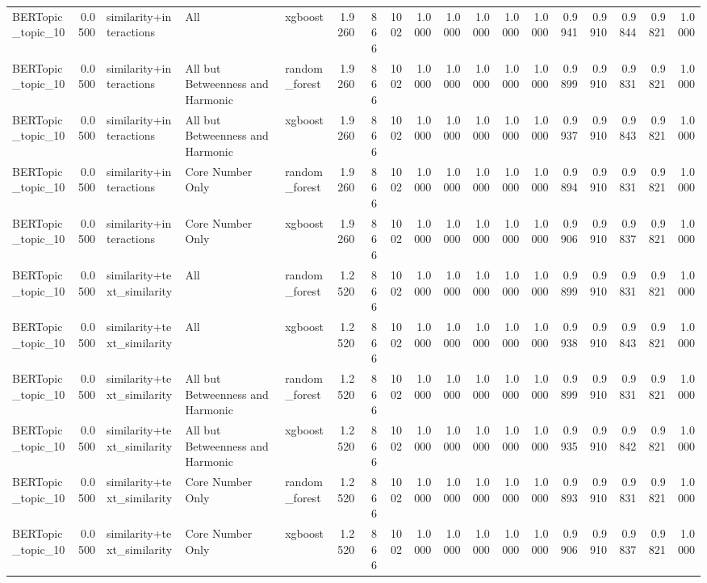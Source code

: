 \begin{tabular}{lrlllrrrrrrrrrrrrr}
BERTopic_topic_10 & 0.0500 & similarity+interactions & All & xgboost & 1.9260 & 866 & 1002 & 1.0000 & 1.0000 & 1.0000 & 1.0000 & 1.0000 & 0.9941 & 0.9910 & 0.9844 & 0.9821 & 1.0000 \\
BERTopic_topic_10 & 0.0500 & similarity+interactions & All but Betweenness and Harmonic & random_forest & 1.9260 & 866 & 1002 & 1.0000 & 1.0000 & 1.0000 & 1.0000 & 1.0000 & 0.9899 & 0.9910 & 0.9831 & 0.9821 & 1.0000 \\
BERTopic_topic_10 & 0.0500 & similarity+interactions & All but Betweenness and Harmonic & xgboost & 1.9260 & 866 & 1002 & 1.0000 & 1.0000 & 1.0000 & 1.0000 & 1.0000 & 0.9937 & 0.9910 & 0.9843 & 0.9821 & 1.0000 \\
BERTopic_topic_10 & 0.0500 & similarity+interactions & Core Number Only & random_forest & 1.9260 & 866 & 1002 & 1.0000 & 1.0000 & 1.0000 & 1.0000 & 1.0000 & 0.9894 & 0.9910 & 0.9831 & 0.9821 & 1.0000 \\
BERTopic_topic_10 & 0.0500 & similarity+interactions & Core Number Only & xgboost & 1.9260 & 866 & 1002 & 1.0000 & 1.0000 & 1.0000 & 1.0000 & 1.0000 & 0.9906 & 0.9910 & 0.9837 & 0.9821 & 1.0000 \\
BERTopic_topic_10 & 0.0500 & similarity+text_similarity & All & random_forest & 1.2520 & 866 & 1002 & 1.0000 & 1.0000 & 1.0000 & 1.0000 & 1.0000 & 0.9899 & 0.9910 & 0.9831 & 0.9821 & 1.0000 \\
BERTopic_topic_10 & 0.0500 & similarity+text_similarity & All & xgboost & 1.2520 & 866 & 1002 & 1.0000 & 1.0000 & 1.0000 & 1.0000 & 1.0000 & 0.9938 & 0.9910 & 0.9843 & 0.9821 & 1.0000 \\
BERTopic_topic_10 & 0.0500 & similarity+text_similarity & All but Betweenness and Harmonic & random_forest & 1.2520 & 866 & 1002 & 1.0000 & 1.0000 & 1.0000 & 1.0000 & 1.0000 & 0.9899 & 0.9910 & 0.9831 & 0.9821 & 1.0000 \\
BERTopic_topic_10 & 0.0500 & similarity+text_similarity & All but Betweenness and Harmonic & xgboost & 1.2520 & 866 & 1002 & 1.0000 & 1.0000 & 1.0000 & 1.0000 & 1.0000 & 0.9935 & 0.9910 & 0.9842 & 0.9821 & 1.0000 \\
BERTopic_topic_10 & 0.0500 & similarity+text_similarity & Core Number Only & random_forest & 1.2520 & 866 & 1002 & 1.0000 & 1.0000 & 1.0000 & 1.0000 & 1.0000 & 0.9893 & 0.9910 & 0.9831 & 0.9821 & 1.0000 \\
BERTopic_topic_10 & 0.0500 & similarity+text_similarity & Core Number Only & xgboost & 1.2520 & 866 & 1002 & 1.0000 & 1.0000 & 1.0000 & 1.0000 & 1.0000 & 0.9906 & 0.9910 & 0.9837 & 0.9821 & 1.0000 \\

\end{tabular}

